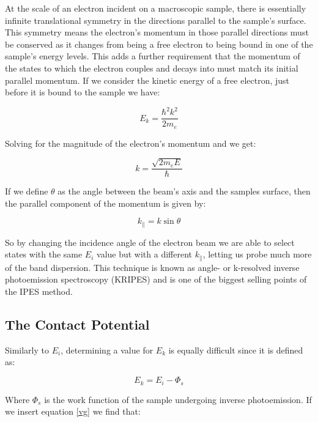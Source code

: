 At the scale of an electron incident on a macroscopic sample, there is essentially infinite translational symmetry in the directions parallel to the sample's surface.
This symmetry means the electron's momentum in those parallel directions must be conserved as it changes from being a free electron to being bound 
in one of the sample's energy levels. This adds a further requirement that the momentum of the states to which the electron couples and decays into must match its initial parallel momentum. 
If we consider the kinetic energy of a free electron\cite{ipes}, just before it is bound to the sample we have:

\begin{equation}
    E_k = \frac{\hbar^2 k^2}{2m_e}
\end{equation}

Solving for the magnitude of the electron's momentum and we get:

\begin{equation}
    k = \frac{\sqrt{2m_e E}}{\hbar}
\end{equation}

If we define $\theta$ as the angle between the beam's axis and the samples surface, then the parallel component of the momentum is given by:

\begin{equation}\label{kpar}
    k_\parallel = k\sin{\theta}
\end{equation}

So by changing the incidence angle of the electron beam we are able to select states with the same $E_i$ value but with a different $k_\parallel$, letting us probe much more of 
the band dispersion. This technique is known as angle- or k-resolved inverse photoemission spectroscopy (KRIPES) and is one of the biggest selling points of the IPES method. 

\subsection{The Contact Potential}

Similarly to $E_i$, determining a value for $E_k$ is equally difficult since it is defined as:

\begin{equation}
  E_k = E_i - \Phi_s
\end{equation}

Where $\Phi_s$ is the work function of the sample undergoing inverse photoemission. If we insert equation \eqref{vg} we find that:

